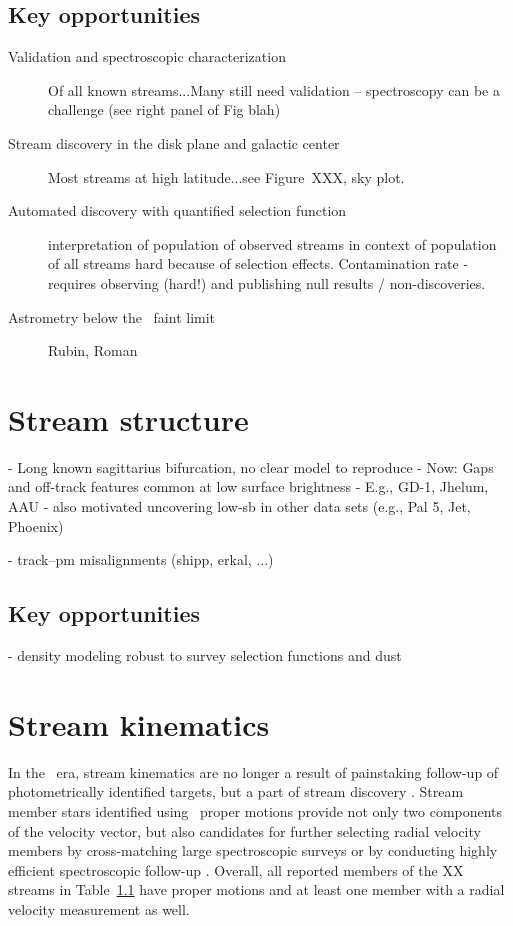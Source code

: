 \documentclass[final,5p,times,twocolumn,authoryear]{elsarticle}
\begin{document}
\subsection{Key opportunities}
\begin{description}
    \item[Validation and spectroscopic characterization] Of all known streams...Many still need validation -- spectroscopy can be a challenge (see right panel of Fig blah)
    \item[Stream discovery in the disk plane and galactic center] Most streams at high latitude...see Figure~XXX, sky plot.
    \item[Automated discovery with quantified selection function] interpretation of population of observed streams in context of population of all streams hard because of selection effects. Contamination rate - requires observing (hard!) and publishing null results / non-discoveries.
    \item[Astrometry below the \gaia\ faint limit] Rubin, Roman
\end{description}



\section{Stream structure}
\label{sec:structure}
- Long known sagittarius bifurcation, no clear model to reproduce
- Now: Gaps and off-track features common at low surface brightness
- E.g., GD-1, Jhelum, AAU
- also motivated uncovering low-sb in other data sets (e.g., Pal 5, Jet, Phoenix)

- track--pm misalignments (shipp, erkal, ...)

\subsection{Key opportunities}
- density modeling robust to survey selection functions and dust



\section{Stream kinematics}
\label{sec:orbits}
In the \gaia\ era, stream kinematics are no longer a result of painstaking follow-up of photometrically identified targets, but a part of stream discovery \citep[e.g.,][]{malhan:2018b, malhan:2019, ibata:2018, ibata:2019, ibata:2021, grillmair:2019, grillmair:2022}.
Stream member stars identified using \gaia\ proper motions provide not only two components of the velocity vector, but also candidates for further selecting radial velocity members by cross-matching large spectroscopic surveys \citep[e.g.,][]{huang:2019, yang:2022, ibata:2024} or by conducting highly efficient spectroscopic follow-up \citep[e.g.,][]{li:2019, bonaca:2020b}.
Overall, all reported members of the XX streams in Table~\ref{} have proper motions and at least one member with a radial velocity measurement as well.
\end{document}
